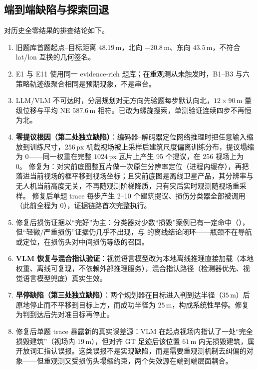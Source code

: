 \subsection{端到端缺陷与探索回退}
\label{sec:x0x3}
对历史全零结果的排查结论如下。
\begin{enumerate}
\item 旧题库首题起点--目标距离 $48.19\,\mathrm{m}$，北向 $-20.8\,\mathrm{m}$、东向 $43.5\,\mathrm{m}$，不符合 lat/lon 互换的几何签名。
\item E1 与 E11 使用同一 evidence-rich 题库；在重观测从未触发时，B1--B3 与六策略轨迹级聚合相同是预期现象，不是串台。
\item LLM/VLM 不可达时，分层规划对无方向先验题每步默认向北，$12\times 90\,\mathrm{m}$ 量级位移与平均 NE $587.6\,\mathrm{m}$ 相符。已改为螺旋搜索，单测验证连续四步不再恒为北。
\item \textbf{零提议根因（第二处独立缺陷）}：编码器--解码器定位网络推理时把任意输入缩放到训练尺寸，$256\,\mathrm{px}$ 机载视场被上采样后建筑尺度偏离训练分布，提议塌缩为 0——同一权重在完整 $1024\,\mathrm{px}$ 瓦片上产生 95 个提议，在 256 视场上为 0。
修复为：对灾前底图整瓦片做一次原生分辨率定位（进程内缓存），再把落进当前视场的框平移到视场坐标；且灾前底图是离线卫星产品，其分辨率与无人机当前高度无关，不再随观测阶梯降质，只有灾后实时观测随视场重采样。
修复后单题 trace 每步产生 2--10 个建筑提议、损伤分类器全部被调用（此前全程为 0），证据链路首次完整执行。
\item 修复后损伤证据以``完好''为主：分类器对少数``损毁''案例已有一定命中（），但``轻微/严重损伤''证据仍几乎不出现，与  的离线结论闭环——瓶颈不在导航或定位，在损伤头对中间损伤等级的召回。
\item \textbf{VLM 恢复与混合指认验证}：视觉语言模型改为本地离线推理直接加载（本地权重、离线可复现，不依赖外部推理服务），混合指认路径（检测器优先、视觉语言模型兜底）真实生效。
\item \textbf{早停缺陷（第三处独立缺陷）}：两个规划器在目标进入判到达半径（$35\,\mathrm{m}$）后原地停止而不平移到目标上方，而成功半径为 $25\,\mathrm{m}$，构成系统性早停。修复为判到达后先对准目标再停止。
\item 修复后单题 trace 暴露新的真实误差源：VLM 在起点视场内指认了一处``完全损毁建筑''（视场内 $19\,\mathrm{m}$），但对齐 GT 足迹后该位置 $61\,\mathrm{m}$ 内无损毁建筑，属开放词汇指认误报。这类误报不是实现缺陷，而是需要重观测机制去纠偏的对象——但重观测又受损伤头塌缩约束，两个失效源在端到端层面耦合。
\end{enumerate}


